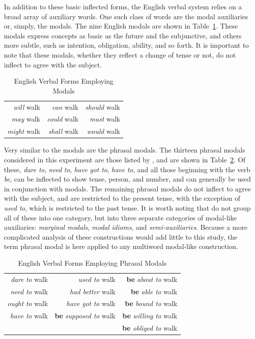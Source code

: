 \documentclass[main.tex]{subfiles}
\begin{document}
In addition to these basic inflected forms, the English verbal system relies on a broad array of auxiliary words. One such class of words are the modal auxiliaries or, simply, the modals. The nine English modals are shown in Table~\ref{table:modal-verbs}. These modals express concepts as basic as the future and the subjunctive, and others more subtle, such as intention, obligation, ability, and so forth. It is important to note that these modals, whether they reflect a change of tense or not, do not inflect to agree with the subject. 

\begin{table}[htbp]
\small
\centering
\caption{English Verbal Forms Employing Modals}
\begin{tabular}{ r r r }
\toprule
\textit{will} walk & \textit{can} walk & \textit{should} walk \\
\textit{may} walk & \textit{could} walk & \textit{must} walk \\
\textit{might} walk & \textit{shall} walk & \textit{would} walk\\
\bottomrule
\end{tabular}
\label{table:modal-verbs}
\end{table}

Very similar to the modals are the phrasal modals. The thirteen phrasal modals considered in this experiment are those listed by \citet[pp. 136-47]{quirk:1985}, and are shown in Table~\ref{table:quasimodal-verbs}. Of these, \textit{dare to}, \textit{need to}, \textit{have got to}, \textit{have to}, and all those beginning with the verb \textit{be}, can be inflected to show tense, person, and number, and can generally be used in conjunction with modals. The remaining phrasal modals do not inflect to agree with the subject, and are restricted to the present tense, with the exception of \textit{used to}, which is restricted to the past tense. It is worth noting that \citet{quirk:1985} do not group all of these into one category, but into three separate categories of modal-like auxiliaries: \textit{marginal modals}, \textit{modal idioms}, and \textit{semi-auxiliaries}. Because a more complicated analysis of these constructions would add little to this study, the term phrasal modal is here applied to any multiword modal-like construction.

\begin{table}[htbp]
\small
\centering
\caption{English Verbal Forms Employing Phrasal Modals}
\begin{tabular}{ r r r }
\toprule
\textit{dare to} walk & \textit{used to} walk & \textbf{be} \textit{about to} walk \\
\textit{need to} walk & \textit{had better} walk & \textbf{be} \textit{able to} walk \\
\textit{ought to} walk & \textit{have got to} walk & \textbf{be} \textit{bound to} walk \\
\textit{have to} walk & \textbf{be} \textit{supposed to} walk & \textbf{be} \textit{willing to} walk\\
&&\textbf{be} \textit{obliged to} walk\\
\bottomrule
\end{tabular}
\label{table:quasimodal-verbs}
\end{table}
\end{document}
